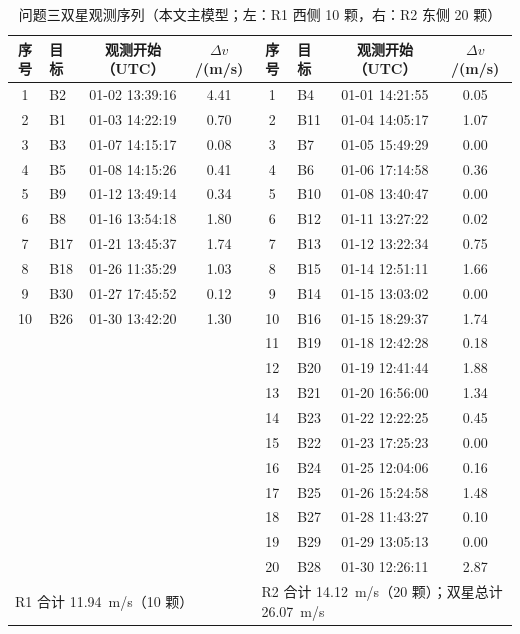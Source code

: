 \begin{table}[!htb]
  \centering
  \caption{问题三双星观测序列（本文主模型；左：R1 西侧 10 颗，右：R2 东侧 20 颗）}
  \label{tab:q3plan}
  \setlength{\tabcolsep}{3pt}
  \begin{tabular}{clcc@{\hspace{10pt}}clcc}
    \toprule
    序号 & 目标 & 观测开始（UTC） & $\Delta v$/(m/s) & 序号 & 目标 & 观测开始（UTC） & $\Delta v$/(m/s) \\
    \midrule
    1 & B2 & 01-02 13:39:16 & 4.41 & 1 & B4 & 01-01 14:21:55 & 0.05 \\
    2 & B1 & 01-03 14:22:19 & 0.70 & 2 & B11 & 01-04 14:05:17 & 1.07 \\
    3 & B3 & 01-07 14:15:17 & 0.08 & 3 & B7 & 01-05 15:49:29 & 0.00 \\
    4 & B5 & 01-08 14:15:26 & 0.41 & 4 & B6 & 01-06 17:14:58 & 0.36 \\
    5 & B9 & 01-12 13:49:14 & 0.34 & 5 & B10 & 01-08 13:40:47 & 0.00 \\
    6 & B8 & 01-16 13:54:18 & 1.80 & 6 & B12 & 01-11 13:27:22 & 0.02 \\
    7 & B17 & 01-21 13:45:37 & 1.74 & 7 & B13 & 01-12 13:22:34 & 0.75 \\
    8 & B18 & 01-26 11:35:29 & 1.03 & 8 & B15 & 01-14 12:51:11 & 1.66 \\
    9 & B30 & 01-27 17:45:52 & 0.12 & 9 & B14 & 01-15 13:03:02 & 0.00 \\
    10 & B26 & 01-30 13:42:20 & 1.30 & 10 & B16 & 01-15 18:29:37 & 1.74 \\
    & & & & 11 & B19 & 01-18 12:42:28 & 0.18 \\
    & & & & 12 & B20 & 01-19 12:41:44 & 1.88 \\
    & & & & 13 & B21 & 01-20 16:56:00 & 1.34 \\
    & & & & 14 & B23 & 01-22 12:22:25 & 0.45 \\
    & & & & 15 & B22 & 01-23 17:25:23 & 0.00 \\
    & & & & 16 & B24 & 01-25 12:04:06 & 0.16 \\
    & & & & 17 & B25 & 01-26 15:24:58 & 1.48 \\
    & & & & 18 & B27 & 01-28 11:43:27 & 0.10 \\
    & & & & 19 & B29 & 01-29 13:05:13 & 0.00 \\
    & & & & 20 & B28 & 01-30 12:26:11 & 2.87 \\
    \midrule
    \multicolumn{4}{l}{R1 合计 11.94~m/s（10 颗）} & \multicolumn{4}{l}{R2 合计 14.12~m/s（20 颗）；双星总计 26.07~m/s} \\
    \bottomrule
  \end{tabular}
\end{table}

